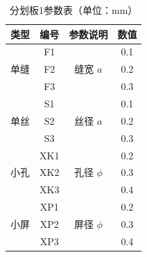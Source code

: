 \documentclass[11pt]{article}
\begin{document}
\begin{table}[H]
\centering
\caption{分划板1参数表（单位：mm）}
\label{tab:reticle1}
\begin{tabular}{|c|c|c|c|}
\hline
\textbf{类型} & \textbf{编号} & \textbf{参数说明} & \textbf{数值} \\
\hline
\multirow{3}{*}{单缝} & F1 & \multirow{3}{*}{缝宽 $a$} & 0.1 \\ \cline{2-2} \cline{4-4}
 & F2 & & 0.2 \\ \cline{2-2} \cline{4-4}
 & F3 & & 0.3 \\
\hline
\multirow{3}{*}{单丝} & S1 & \multirow{3}{*}{丝径 $a$} & 0.1 \\ \cline{2-2} \cline{4-4}
 & S2 & & 0.2 \\ \cline{2-2} \cline{4-4}
 & S3 & & 0.3 \\
\hline
\multirow{3}{*}{小孔} & XK1 & \multirow{3}{*}{孔径 $\phi$} & 0.2 \\ \cline{2-2} \cline{4-4}
 & XK2 & & 0.3 \\ \cline{2-2} \cline{4-4}
 & XK3 & & 0.4 \\
\hline
\multirow{3}{*}{小屏} & XP1 & \multirow{3}{*}{屏径 $\phi$} & 0.2 \\ \cline{2-2} \cline{4-4}
 & XP2 & & 0.3 \\ \cline{2-2} \cline{4-4}
 & XP3 & & 0.4 \\
\hline
\end{tabular}
\end{table}
\end{document}
